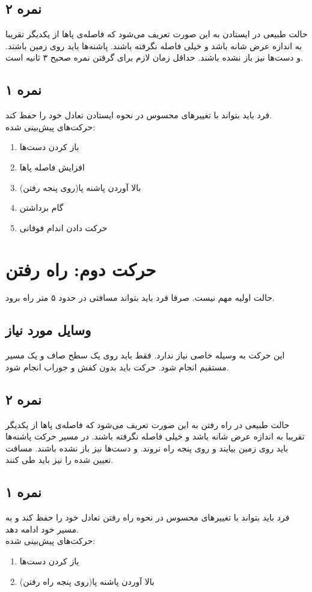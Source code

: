 \documentclass[12pt]{report}
\begin{document}
	\subsection*{نمره ۲}
	حالت طبیعی در ایستادن به این صورت تعریف می‌شود که فاصله‌ی پاها از یکدیگر تقریبا به اندازه عرض شانه باشد و خیلی فاصله نگرفته باشند. پاشنه‌ها باید روی زمین باشند. و دست‌ها نیز باز نشده باشند. حداقل زمان لازم برای گرفتن نمره صحیح ۳ ثانیه است.
	\subsection*{نمره ۱}
	فرد باید بتواند با تغییر‌های محسوس در نحوه ایستادن تعادل خود را حفظ کند.\\
	حرکت‌های پیش‌بینی شده:
	\begin{enumerate}
		\item باز کردن دست‌ها
		\item افزایش فاصله پاها
		\item بالا آوردن پاشنه پا(روی پنجه رفتن)
		\item گام برداشتن
		\item حرکت دادن اندام فوقانی
	\end{enumerate}
	\newpage
	
	\section*{حرکت دوم: راه رفتن}
	حالت اولیه مهم نیست. صرفا فرد باید بتواند مسافتی در حدود ۵ متر راه برود.
	\subsection*{وسایل مورد نیاز}
	این حرکت به وسیله خاصی نیاز ندارد. فقط باید روی یک سطح صاف و یک مسیر مستقیم انجام شود. حرکت باید بدون کفش و جوراب انجام شود.
	\subsection*{نمره ۲}
	حالت طبیعی در راه رفتن  به این صورت تعریف می‌شود که فاصله‌ی پاها از یکدیگر تقریبا به اندازه عرض شانه باشد و خیلی فاصله نگرفته باشند. در مسیر حرکت پاشنه‌ها باید روی زمین بیایند و روی پنجه راه نروند. و دست‌ها نیز باز نشده باشند. مسافت تعیین شده را نیز باید طی کنند.
	\subsection*{نمره ۱}
	فرد باید بتواند با تغییر‌های محسوس در نحوه راه رفتن تعادل خود را حفظ کند و به مسیر خود ادامه دهد.\\
	حرکت‌های پیش‌بینی شده:
	\begin{enumerate}
		\item باز کردن دست‌ها
		\item بالا آوردن پاشنه پا(روی پنجه راه رفتن)
	\end{enumerate}
	\newpage
	
\end{document}
